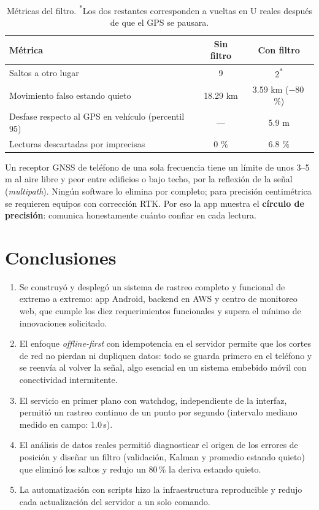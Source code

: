 \documentclass[11pt]{article}
\begin{document}
\begin{table}[H]
\centering
\small
\begin{tabular}{l c c}
\toprule
\textbf{Métrica} & \textbf{Sin filtro} & \textbf{Con filtro} \\
\midrule
Saltos a otro lugar & 9 & 2\textsuperscript{*} \\
Movimiento falso estando quieto & 18.29 km & 3.59 km ($-80$\,\%) \\
Desfase respecto al GPS en vehículo (percentil 95) & — & 5.9 m \\
Lecturas descartadas por imprecisas & 0 \% & 6.8 \% \\
\bottomrule
\end{tabular}
\caption{Métricas del filtro. \textsuperscript{*}Los dos restantes corresponden a vueltas en U reales
después de que el GPS se pausara.}
\end{table}

\begin{alerta}
Un receptor GNSS de teléfono de una sola frecuencia tiene un límite de unos 3--5\,m al aire libre y peor
entre edificios o bajo techo, por la reflexión de la señal (\emph{multipath}). Ningún software lo elimina por
completo; para precisión centimétrica se requieren equipos con corrección RTK. Por eso la app muestra el
\textbf{círculo de precisión}: comunica honestamente cuánto confiar en cada lectura.
\end{alerta}

\section{Conclusiones}

\begin{enumerate}
  \item Se construyó y desplegó un sistema de rastreo completo y funcional de extremo a extremo: app
        Android, backend en AWS y centro de monitoreo web, que cumple los diez requerimientos funcionales y
        supera el mínimo de innovaciones solicitado.
  \item El enfoque \emph{offline-first} con idempotencia en el servidor permite que los cortes de red no
        pierdan ni dupliquen datos: todo se guarda primero en el teléfono y se reenvía al volver la señal, algo esencial en un sistema embebido móvil con conectividad intermitente.
  \item El servicio en primer plano con watchdog, independiente de la interfaz, permitió un rastreo continuo
        de un punto por segundo (intervalo mediano medido en campo: 1.0\,s).
  \item El análisis de datos reales permitió diagnosticar el origen de los errores de posición y diseñar un
        filtro (validación, Kalman y promedio estando quieto) que eliminó los saltos y redujo un 80\,\% la
        deriva estando quieto.
  \item La automatización con scripts hizo la infraestructura reproducible y redujo cada actualización del
        servidor a un solo comando.
\end{enumerate}
\end{document}
